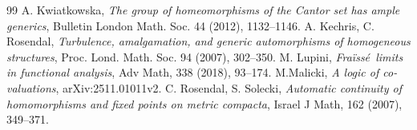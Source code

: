 \documentclass[12pt]{amsart}
\numberwithin{equation}{section}
\theoremstyle{plain}
\theoremstyle{definition}
\newcommand \fra{Fra\"{i}ss\'{e}}
\begin{document}
\begin{thebibliography}{99}
	  A. Kwiatkowska, \emph{The group of homeomorphisms of the Cantor set has ample generics}, Bulletin London Math. Soc. 44 (2012), 1132--1146.
	 A. Kechris, C. Rosendal, \emph{Turbulence, amalgamation, and generic automorphisms of homogeneous
	structures}, Proc. Lond. Math. Soc. 94 (2007), 302--350.
	 M. Lupini, \emph{\fra \ limits in functional analysis}, Adv Math, 338 (2018), 93--174.
	 M.Malicki, \emph{A logic of co-valuations}, arXiv:2511.01011v2.
	 C. Rosendal, S. Solecki, \emph{Automatic continuity of homomorphisms and fixed points on metric compacta}, Israel J Math, 162 (2007), 349--371.
	
\end{thebibliography}
\end{document}
